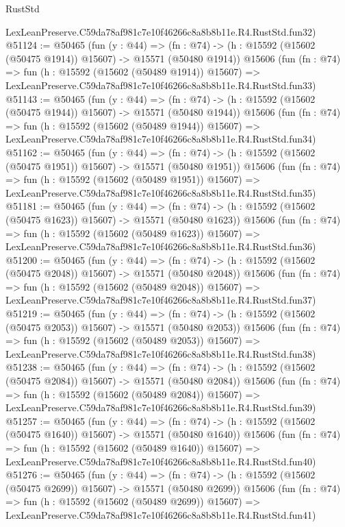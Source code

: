 \begin{lexlean}{RustStd}
\begin{coremodule}
    LexLeanPreserve.C59da78af981c7e10f46266c8a8b8b11e.R4.RustStd.fun32)
@51124 := @50465
    (fun (y : @44) =>
    (fn : @74) -> (h : @15592 (@15602 (@50475 @1914)) @15607) -> @15571 (@50480 @1914))
    @15606
    (fun (fn : @74) =>
    fun (h : @15592 (@15602 (@50489 @1914)) @15607) =>
    LexLeanPreserve.C59da78af981c7e10f46266c8a8b8b11e.R4.RustStd.fun33)
@51143 := @50465
    (fun (y : @44) =>
    (fn : @74) -> (h : @15592 (@15602 (@50475 @1944)) @15607) -> @15571 (@50480 @1944))
    @15606
    (fun (fn : @74) =>
    fun (h : @15592 (@15602 (@50489 @1944)) @15607) =>
    LexLeanPreserve.C59da78af981c7e10f46266c8a8b8b11e.R4.RustStd.fun34)
@51162 := @50465
    (fun (y : @44) =>
    (fn : @74) -> (h : @15592 (@15602 (@50475 @1951)) @15607) -> @15571 (@50480 @1951))
    @15606
    (fun (fn : @74) =>
    fun (h : @15592 (@15602 (@50489 @1951)) @15607) =>
    LexLeanPreserve.C59da78af981c7e10f46266c8a8b8b11e.R4.RustStd.fun35)
@51181 := @50465
    (fun (y : @44) =>
    (fn : @74) -> (h : @15592 (@15602 (@50475 @1623)) @15607) -> @15571 (@50480 @1623))
    @15606
    (fun (fn : @74) =>
    fun (h : @15592 (@15602 (@50489 @1623)) @15607) =>
    LexLeanPreserve.C59da78af981c7e10f46266c8a8b8b11e.R4.RustStd.fun36)
@51200 := @50465
    (fun (y : @44) =>
    (fn : @74) -> (h : @15592 (@15602 (@50475 @2048)) @15607) -> @15571 (@50480 @2048))
    @15606
    (fun (fn : @74) =>
    fun (h : @15592 (@15602 (@50489 @2048)) @15607) =>
    LexLeanPreserve.C59da78af981c7e10f46266c8a8b8b11e.R4.RustStd.fun37)
@51219 := @50465
    (fun (y : @44) =>
    (fn : @74) -> (h : @15592 (@15602 (@50475 @2053)) @15607) -> @15571 (@50480 @2053))
    @15606
    (fun (fn : @74) =>
    fun (h : @15592 (@15602 (@50489 @2053)) @15607) =>
    LexLeanPreserve.C59da78af981c7e10f46266c8a8b8b11e.R4.RustStd.fun38)
@51238 := @50465
    (fun (y : @44) =>
    (fn : @74) -> (h : @15592 (@15602 (@50475 @2084)) @15607) -> @15571 (@50480 @2084))
    @15606
    (fun (fn : @74) =>
    fun (h : @15592 (@15602 (@50489 @2084)) @15607) =>
    LexLeanPreserve.C59da78af981c7e10f46266c8a8b8b11e.R4.RustStd.fun39)
@51257 := @50465
    (fun (y : @44) =>
    (fn : @74) -> (h : @15592 (@15602 (@50475 @1640)) @15607) -> @15571 (@50480 @1640))
    @15606
    (fun (fn : @74) =>
    fun (h : @15592 (@15602 (@50489 @1640)) @15607) =>
    LexLeanPreserve.C59da78af981c7e10f46266c8a8b8b11e.R4.RustStd.fun40)
@51276 := @50465
    (fun (y : @44) =>
    (fn : @74) -> (h : @15592 (@15602 (@50475 @2699)) @15607) -> @15571 (@50480 @2699))
    @15606
    (fun (fn : @74) =>
    fun (h : @15592 (@15602 (@50489 @2699)) @15607) =>
    LexLeanPreserve.C59da78af981c7e10f46266c8a8b8b11e.R4.RustStd.fun41)

\end{coremodule}
\end{lexlean}
